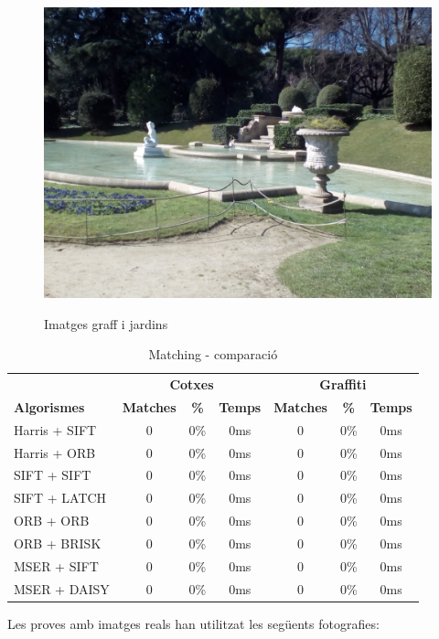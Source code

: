 \begin{figure}[!htb]
				\label{fig:awesome_image3}
			\endminipage\hfill
				\includegraphics[width=\linewidth]{images/experiments/jardi2}
				\label{fig:awesome_image3}
			\endminipage
			\caption{Imatges graff i jardins}
		\end{figure}

		\begin{table}[H]
			\begin{center}
				\begin{tabular}{l | c c c | c c c}
					& \multicolumn{3}{c|}{\textbf{Cotxes}} & \multicolumn{3}{c}{\textbf{Graffiti}} \\
					\textbf{Algorismes} & \textbf{Matches} & \textbf{\%} & \textbf{Temps} & \textbf{Matches} & \textbf{\%} & \textbf{Temps} \\ \hline
					Harris + SIFT & 0 & 0\% & 0ms & 0 & 0\% & 0ms \\
					Harris + ORB & 0 & 0\% & 0ms & 0 & 0\% & 0ms \\
					SIFT + SIFT & 0 & 0\% & 0ms & 0 & 0\% & 0ms \\
					SIFT + LATCH & 0 & 0\% & 0ms & 0 & 0\% & 0ms \\
					ORB + ORB & 0 & 0\% & 0ms & 0 & 0\% & 0ms \\
					ORB + BRISK & 0 & 0\% & 0ms & 0 & 0\% & 0ms \\
					MSER + SIFT & 0 & 0\% & 0ms & 0 & 0\% & 0ms \\
					MSER + DAISY & 0 & 0\% & 0ms & 0 & 0\% & 0ms \\
				\end{tabular}
			\end{center}
			\caption{Matching - comparació}
		\end{table}
		\noindent
		Les proves amb imatges reals han utilitzat les següents fotografies:

